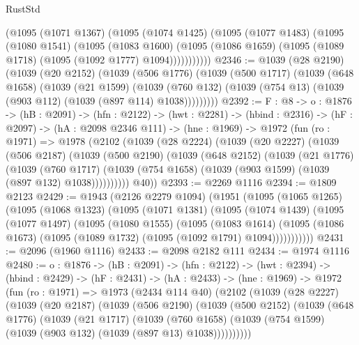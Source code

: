 \begin{lexlean}{RustStd}
\begin{coremodule}
{\begin{coremodule}
          (@1095
            (@1071 @1367)
            (@1095
              (@1074 @1425)
              (@1095
                (@1077 @1483)
                (@1095
                  (@1080 @1541)
                  (@1095
                    (@1083 @1600)
                    (@1095 (@1086 @1659) (@1095 (@1089 @1718) (@1095 (@1092 @1777) @1094)))))))))))
@2346 := @1039
    (@28 @2190)
    (@1039
      (@20 @2152)
      (@1039
        (@506 @1776)
        (@1039
          (@500 @1717)
          (@1039
            (@648 @1658)
            (@1039
              (@21 @1599)
              (@1039
                (@760 @132)
                (@1039 (@754 @13) (@1039 (@903 @112) (@1039 (@897 @114) @1038)))))))))
@2392 := {F : @8} ->
  {o : @1876} ->
  (hB : @2091) ->
  (hfn : @2122) ->
  (hwt : @2281) ->
  (hbind : @2316) ->
  (hF : @2097) ->
  (hA : @2098 @2346 @111) ->
  (hne : @1969) ->
  @1972
    (fun (ro : @1971) =>
    @1978
      (@2102
        (@1039
          (@28 @2224)
          (@1039
            (@20 @2227)
            (@1039
              (@506 @2187)
              (@1039
                (@500 @2190)
                (@1039
                  (@648 @2152)
                  (@1039
                    (@21 @1776)
                    (@1039
                      (@760 @1717)
                      (@1039 (@754 @1658) (@1039 (@903 @1599) (@1039 (@897 @132) @1038))))))))))
        @40))
@2393 := @2269 @1116
@2394 := @1809 @2123
@2429 := @1943
    (@2126 @2279 @1094)
    (@1951
      (@1095
        (@1065 @1265)
        (@1095
          (@1068 @1323)
          (@1095
            (@1071 @1381)
            (@1095
              (@1074 @1439)
              (@1095
                (@1077 @1497)
                (@1095
                  (@1080 @1555)
                  (@1095
                    (@1083 @1614)
                    (@1095 (@1086 @1673) (@1095 (@1089 @1732) (@1095 (@1092 @1791) @1094)))))))))))
@2431 := @2096 (@1960 @1116)
@2433 := @2098 @2182 @111
@2434 := @1974 @1116
@2480 := {o : @1876} ->
  (hB : @2091) ->
  (hfn : @2122) ->
  (hwt : @2394) ->
  (hbind : @2429) ->
  (hF : @2431) ->
  (hA : @2433) ->
  (hne : @1969) ->
  @1972
    (fun (ro : @1971) =>
    @1973
      (@2434 @114 @40)
      (@2102
        (@1039
          (@28 @2227)
          (@1039
            (@20 @2187)
            (@1039
              (@506 @2190)
              (@1039
                (@500 @2152)
                (@1039
                  (@648 @1776)
                  (@1039
                    (@21 @1717)
                    (@1039
                      (@760 @1658)
                      (@1039 (@754 @1599) (@1039 (@903 @132) (@1039 (@897 @13) @1038))))))))))

\end{coremodule}}
\end{coremodule}
\end{lexlean}
